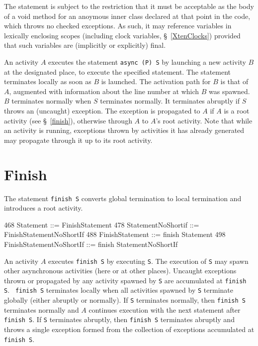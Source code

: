 The statement is subject to the restriction that it must be acceptable
as the body of a {\cf void} method for an anoymous inner class
declared at that point in the code, which throws no checked
exceptions. As such, it may reference variables in lexically enclosing
scopes (including {\cf clock} variables, \S~\ref{XtenClocks}) provided
that such variables are (implicitly or explicitly) {\cf final}.

An activity $A$ executes the statement {\tt async (P) S} by launching
a new activity $B$ at the designated place, to execute the specified
statement. The statement terminates locally as soon as $B$ is
launched.  The activation path for $B$ is that of $A$, augmented with
information about the line number at which $B$ was spawned.  $B$
terminates normally when $S$ terminates normally.  It terminates
abruptly if $S$ throws an (uncaught) exception. The exception is
propagated to $A$ if $A$ is a root activity (see
\S~\ref{finish}), otherwise through $A$ to $A$'s root
activity. Note that while an activity is running, exceptions thrown by
activities it has already generated may propagate through it up to its
root activity.

\section{Finish}\label{finish}
The statement {\tt finish S} converts global termination to local
termination and introduces a root activity. 
\begin{x10}
468 Statement ::= FinishStatement
478 StatementNoShortif ::= FinishStatementNoShortIf
488 FinishStatement ::= finish Statement
498 FinishStatementNoShortIf ::= 
      finish StatementNoShortIf
\end{x10}

An activity $A$ executes {\tt finish S} by executing {\tt S}.  The
execution of {\tt S} may spawn other asynchronous activities (here or
at other places).  Uncaught exceptions thrown or propagated by any
activity spawned by {\tt S} are accumulated at {\tt finish S}.  {\tt
finish S} terminates locally when all activities spawned by {\tt S}
terminate globally (either abruptly or normally). If
{\tt S} terminates normally, then {\tt finish S} terminates normally
and $A$ continues execution with the next statement after {\tt finish S}.
If {\tt S} terminates abruptly, then {\tt finish S}
terminates abruptly and throws a single exception formed 
from the collection of exceptions accumulated at {\tt finish S}.

